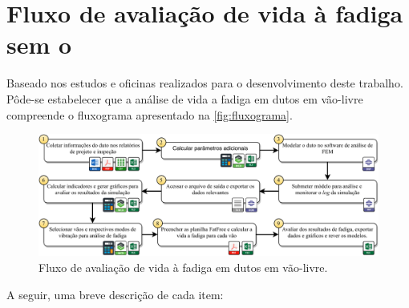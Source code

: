 \section{Fluxo de avaliação de vida à fadiga sem o \frame}\label{sec:workflow}


Baseado nos estudos e oficinas realizados para o desenvolvimento deste trabalho. Pôde-se estabelecer que a análise de vida a fadiga em dutos em vão-livre compreende o fluxograma apresentado na \autoref{fig:fluxograma}. %

\begin{figure}[!ht]
    \centering
    \caption{Fluxo de avaliação de vida à fadiga em dutos em vão-livre.}\label{fig:fluxograma}
    \includegraphics[width=\textwidth]{imagens/fluxograma.pdf}
\end{figure}

A seguir, uma breve descrição de cada item:

